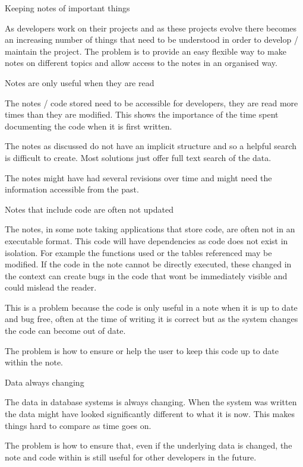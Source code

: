 \begin{problem}{Keeping notes of important things}

As developers work on their projects and as these projects evolve there
becomes an increasing number of things that need to be understood in
order to develop / maintain the project. The problem is to provide an
easy flexible way to make notes on different topics and allow access to
the notes in an organised way.

\end{problem}

\begin{problem}{Notes are only useful when they are read}

The notes / code stored need to be accessible for developers, they are read
more times than they are modified. This shows the importance of the time spent
documenting the code when it is first written.

The notes as discussed do not have an implicit structure and so a helpful
search is difficult to create. Most solutions just offer full text
search of the data.

The notes might have had several revisions over time and might need the
information accessible from the past.

\end{problem}


\begin{problem}{Notes that include code are often not updated}

The notes, in some note taking applications that store code, are often not in an
executable format. This code will have dependencies as code does not exist in
isolation. For example the functions used or the tables referenced may be
modified. If the code in the note cannot be directly executed, these changed
in the context can create bugs in the code that wont be immediately visible and
could mislead the reader.

This is a problem because the code is only useful in a note when it is
up to date and bug free, often at the time of writing it is correct but
as the system changes the code can become out of date.

The problem is how to ensure or help the user to keep this code up to
date within the note.

\end{problem}

\begin{problem}{Data always changing}

The data in database systems is always changing. When the system was
written the data might have looked significantly different to what it is
now. This makes things hard to compare as time goes on.

The problem is how to ensure that, even if the underlying data is
changed, the note and code within is still useful for other developers
in the future.

\end{problem}


